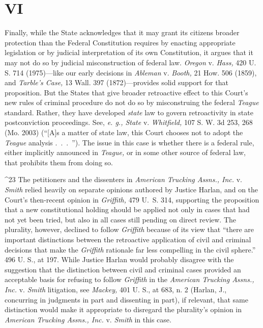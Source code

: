 {{{{\section{VI}

  Finally, while the State acknowledges that it may grant its
citizens broader protection than the Federal Constitution requires
by enacting appropriate legislation or by judicial interpretation of
its own Constitution, it argues that it may not do so by judicial
misconstruction of federal law. \emph{Oregon} v. \emph{Hass,} 420 U. S.
714 (1975)---like our early decisions in \emph{Ableman} v. \emph{Booth,}
21 How. 506 (1859), and \emph{Tarble's Case,} 13 Wall. 397
(1872)---provides solid support for that proposition. But \newpage 
the States that give broader retroactive effect to this Court's new
rules of criminal procedure do not do so by misconstruing the federal
\emph{Teague} standard. Rather, they have developed \emph{state} law to
govern retroactivity in state postconviction proceedings. See, \emph{e.
g., State} v. \emph{Whitfield,} 107 S. W. 3d 253, 268 (Mo. 2003) (``[A]s
a matter of state law, this Court chooses not to adopt the \emph{Teague}
analysis .~.~.~''). The issue in this case is whether there is a
federal rule, either implicitly announced in \emph{Teague,} or in some
other source of federal law, that prohibits them from doing so.

^23 The petitioners and the dissenters in \emph{American Trucking Assns.,
Inc.} v. \emph{Smith} relied heavily on separate opinions authored
by Justice Harlan, and on the Court's then-recent opinion in
\emph{Griffith,} 479 U.~S. 314, supporting the proposition that a new
constitutional holding should be applied not only in cases that had not
yet been tried, but also in all cases still pending on direct review.
The plurality, however, declined to follow \emph{Griffith} because of its
view that ``there are important distinctions between the retroactive
application of civil and criminal decisions that make the \emph{Griffith}
rationale far less compelling in the civil sphere.'' 496 U. S., at 197.
While Justice Harlan would probably disagree with the suggestion that
the distinction between civil and criminal cases provided an acceptable
basis for refusing to follow \emph{Griffith} in the \emph{American Trucking
Assns., Inc.} v. \emph{Smith} litigation, see \emph{Mackey,} 401 U. S., at
683, n. 2 (Harlan, J., concurring in judgments in part and dissenting in
part), if relevant, that same distinction would make it appropriate
to disregard the plurality's opinion in \emph{American Trucking Assns.,
Inc.} v. \emph{Smith} in this case.


}}}}
